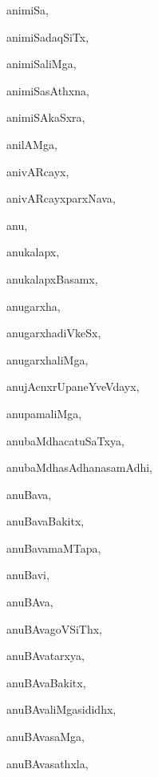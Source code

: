 \begin{multicols}{3}
{\noindent
{animiSa}, \pageref{animiSa}

\noindent
{animiSadaqSiTx}, \pageref{animiSadaqSiTx}

\noindent
{animiSaliMga}, \pageref{animiSaliMga}

\noindent
{animiSasAthxna}, \pageref{animiSasAthxna}

\noindent
{animiSAkaSxra}, \pageref{animiSAkaSxra}

\noindent
{anilAMga}, \pageref{anilAMga}

\noindent
{anivARcayx}, \pageref{anivARcayx}

\noindent
{anivARcayxparxNava}, \pageref{anivARcayxparxNava}

\noindent
{anu}, \pageref{anu}

\noindent
{anukalapx}, \pageref{anukalapx}

\noindent
{anukalapxBasamx}, \pageref{anukalapxBasamx}

\noindent
{anugarxha}, \pageref{anugarxha}

\noindent
{anugarxhadiVkeSx}, \pageref{anugarxhadiVkeSx}

\noindent
{anugarxhaliMga}, \pageref{anugarxhaliMga}

\noindent
{anujAcnxrUpaneYveVdayx}, \pageref{anujAcnxrUpaneYveVdayx}

\noindent
{anupamaliMga}, \pageref{anupamaliMga}

\noindent
{anubaMdhacatuSaTxya}, \pageref{anubaMdhacatuSaTxya}

\noindent
{anubaMdhasAdhanasamAdhi}, \pageref{anubaMdhasAdhanasamAdhi}

\noindent
{anuBava}, \pageref{anuBava}

\noindent
{anuBavaBakitx}, \pageref{anuBavaBakitx}

\noindent
{anuBavamaMTapa}, \pageref{anuBavamaMTapa}

\noindent
{anuBavi}, \pageref{anuBavi}

\noindent
{anuBAva}, \pageref{anuBAva}

\noindent
{anuBAvagoVSiThx}, \pageref{anuBAvagoVSiThx}

\noindent
{anuBAvatarxya}, \pageref{anuBAvatarxya}

\noindent
{anuBAvaBakitx}, \pageref{anuBAvaBakitx}

\noindent
{anuBAvaliMgasididhx}, \pageref{anuBAvaliMgasididhx}

\noindent
{anuBAvasaMga}, \pageref{anuBAvasaMga}

\noindent
{anuBAvasathxla}, \pageref{anuBAvasathxla}

}
\end{multicols}
